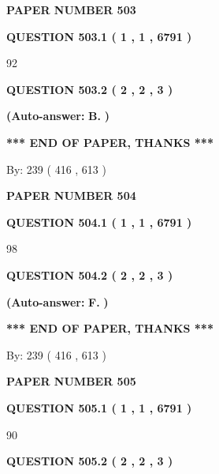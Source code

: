 \documentclass[12pt]{article}
\begin{document}
   
\newpage 
\setcounter{page}{ 
   503001 } 
   
   
 {\textbf{ \Large{ PAPER NUMBER  503  }}}
   
   
   
   
  
  
{\textbf{\large{QUESTION
503.1 
 ( 1 , 1 , 6791 )
}}}

92
  
  
{\textbf{\large{QUESTION
503.2 
 ( 2 , 2 , 3 )
}}}
 
 
{\textbf{(Auto-answer:}}
{\textbf{\large{
B.}}}
{\textbf{)}}
 
 
   
   
   
   
\vspace{1.0in} 
{\textbf{\large{ *** END OF PAPER, THANKS *** }}} 
   
   
\hspace{1.0in} By: 
 239 ( 416 ,  613 )
   
   
   
   
\newpage 
\setcounter{page}{ 
   504001 } 
   
   
 {\textbf{ \Large{ PAPER NUMBER  504  }}}
   
   
   
   
  
  
{\textbf{\large{QUESTION
504.1 
 ( 1 , 1 , 6791 )
}}}

98
  
  
{\textbf{\large{QUESTION
504.2 
 ( 2 , 2 , 3 )
}}}
 
 
{\textbf{(Auto-answer:}}
{\textbf{\large{
F.}}}
{\textbf{)}}
 
 
   
   
   
   
\vspace{1.0in} 
{\textbf{\large{ *** END OF PAPER, THANKS *** }}} 
   
   
\hspace{1.0in} By: 
 239 ( 416 ,  613 )
   
   
   
   
\newpage 
\setcounter{page}{ 
   505001 } 
   
   
 {\textbf{ \Large{ PAPER NUMBER  505  }}}
   
   
   
   
  
  
{\textbf{\large{QUESTION
505.1 
 ( 1 , 1 , 6791 )
}}}

90
  
  
{\textbf{\large{QUESTION
505.2 
 ( 2 , 2 , 3 )
}}}
 
\end{document}
